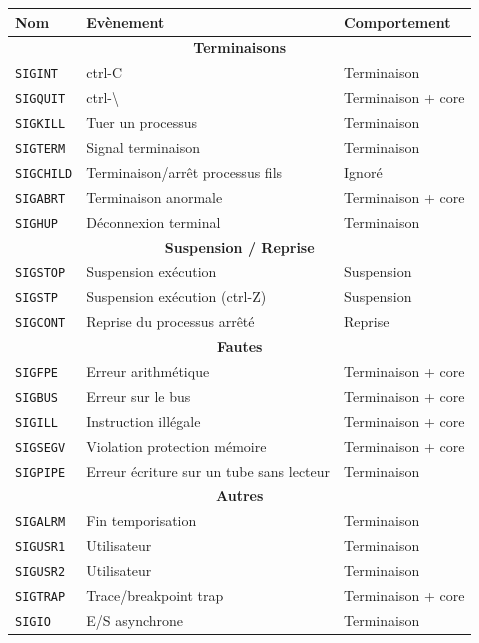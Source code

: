 \documentclass[french]{scrartcl}
\begin{document}
\begin{multicols}{3}
{\begin{tabularx}{3.4in}{lXl}
	\toprule
	\textbf{Nom} & \textbf{Evènement} & \textbf{Comportement}\\
	\midrule
	\multicolumn{3}{c}{\textbf{Terminaisons}}\\
	\midrule
	\lstinline!SIGINT! & ctrl-C & Terminaison\\
	\lstinline!SIGQUIT! & ctrl-\textbackslash & Terminaison + core\\
	\lstinline!SIGKILL! & Tuer un processus & Terminaison\\
	\lstinline!SIGTERM! & Signal terminaison & Terminaison\\
	\lstinline!SIGCHILD! & Terminaison/arrêt processus fils & Ignoré\\
	\lstinline!SIGABRT! & Terminaison anormale & Terminaison + core\\
	\lstinline!SIGHUP! & Déconnexion terminal & Terminaison\\
	\midrule
	\multicolumn{3}{c}{\textbf{Suspension / Reprise}}\\
	\midrule
	\lstinline!SIGSTOP! & Suspension exécution & Suspension\\
	\lstinline!SIGSTP! & Suspension exécution (ctrl-Z) & Suspension\\
	\lstinline!SIGCONT! & Reprise du processus arrêté & Reprise\\
	\midrule
	\multicolumn{3}{c}{\textbf{Fautes}}\\
	\midrule
	\lstinline!SIGFPE! & Erreur arithmétique & Terminaison + core\\
	\lstinline!SIGBUS! & Erreur sur le bus & Terminaison + core\\
	\lstinline!SIGILL! & Instruction illégale & Terminaison + core\\
	\lstinline!SIGSEGV! & Violation protection mémoire & Terminaison + core\\
	\lstinline!SIGPIPE! & Erreur écriture sur un tube sans lecteur & Terminaison\\
	\midrule
	\multicolumn{3}{c}{\textbf{Autres}}\\
	\midrule
	\lstinline!SIGALRM! & Fin temporisation & Terminaison\\
	\lstinline!SIGUSR1! & Utilisateur & Terminaison\\
	\lstinline!SIGUSR2! & Utilisateur & Terminaison\\
	\lstinline!SIGTRAP! & Trace/breakpoint trap & Terminaison + core\\
	\lstinline!SIGIO! & E/S asynchrone & Terminaison\\
	\bottomrule
\end{tabularx}
}


\end{multicols}
\end{document}
